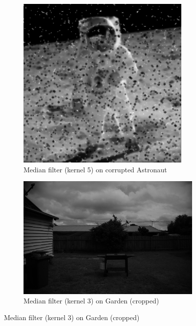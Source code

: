 \documentclass{article}
\begin{document}
\begin{figure}[H]
	\begin{subfigure}{0.4\textwidth}
		\includegraphics[width=\textwidth]{Generated/Astronaut_salt_pepper_median3filter.png}
		\caption{Median filter (kernel 5) on corrupted Astronaut}
		\label{fig:median3_Astronaut}
	\end{subfigure}

	\begin{subfigure}{0.4\textwidth}
		\includegraphics[trim={20cm 25cm 25cm 10cm},clip,width=\textwidth]{Generated/Garden_median3filter.png}
		\caption{Median filter (kernel 3) on Garden (cropped)}
		\label{fig:median3_Garden}
	\end{subfigure}
	\label{Median filter}
\end{figure}
\end{document}
